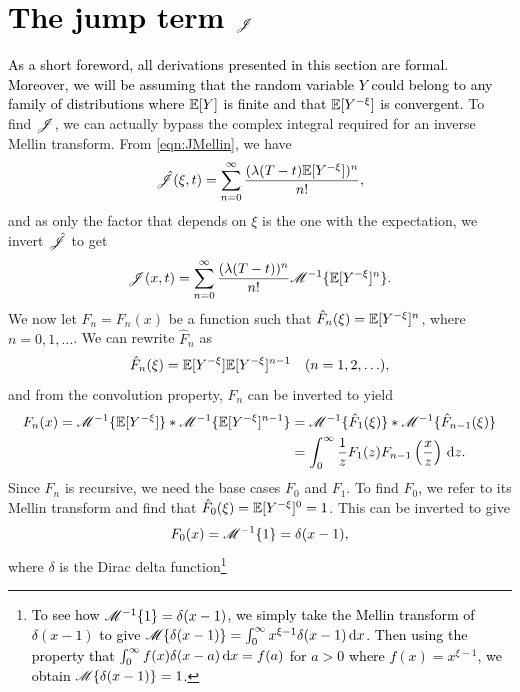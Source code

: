 \section{\textcolor{black}{The jump term $\mathscr J$}}
\textcolor{black}{As a short foreword, all derivations presented in this section are formal. Moreover, we will be assuming that the random variable $Y$ could belong to any family of distributions where $\mathbb E[Y]$ is finite and that $\mathbb E[Y^{-\xi}]$ is convergent.} To find $\mathscr J$, we can actually bypass the complex integral required for an inverse Mellin transform. From \eqref{eqn:JMellin}, we have
	\begin{align*}
		\hat {\mathscr J}(\xi,t) = \displaystyle\sum\limits_{n=0}^{\infty} \frac{(\lambda(T-t)\mathbb E[Y^{-\xi}])^n}{n!},
	\end{align*}
and as only the factor that depends on $\xi$ is the one with the expectation, we invert $\hat {\mathscr J}$ to get
	\begin{equation}
		\label{eqn:Jhat}
		\mathscr J(x,t) = \displaystyle\sum\limits_{n=0}^{\infty} \frac{(\lambda(T-t))^n}{n!}\mathscr M^{-1}\{ \mathbb E[Y^{-\xi}]^n \}.
	\end{equation}
We now let $F_n = F_n(x)$ be a function such that $\hat F_n(\xi) = \mathbb E[Y^{-\xi}]^n$, where $ n = 0, 1, \ldots$. We can rewrite $\hat F_n$ as
	\begin{equation*}
		\hat F_n(\xi) = \mathbb E[Y^{-\xi}] \mathbb E[Y^{-\xi}]^{n-1} \quad (n = 1,2,\ldots),
	\end{equation*}
and from the convolution property, $\hat F_n$ can be inverted to yield
	\begin{align*}
		F_n(x) = \mathscr M^{-1} \{ \mathbb E[Y^{-\xi}] \} \ast \mathscr M^{-1} \{ \mathbb E[Y^{-\xi}]^{n-1} \} &= \mathscr M^{-1}\{ \hat F_1(\xi) \} \ast \mathscr M^{-1}\{ \hat F_{n-1}(\xi) \} \\
		&= \int_0^\infty \frac{1}{z} F_1(z)F_{n-1}\left( \frac{x}{z} \right) \, \mathrm d z.
	\end{align*}
Since $F_n$ is recursive, we need the base cases $F_0$ and $F_1$. To find $F_0$, we refer to its Mellin transform and find that $\hat F_0(\xi) = \mathbb E[Y^{-\xi}]^0 = 1$. This can be inverted to give
	\begin{equation*}
		F_0(x) = \mathscr M^{-1}\{ 1 \} = \delta(x-1),
	\end{equation*}
where $\delta$ is the Dirac delta function\footnote{\textcolor{black}{To see how $\mathscr M^{-1}\{1\} = \delta(x-1)$, we simply take the Mellin transform of $\delta(x-1)$ to give $\mathscr M\{\delta(x-1)\} = \int_0^\infty x^{\xi-1}\delta(x-1) \, \mathrm d x$. Then using the property that $\int_0^\infty f(x)\delta(x-a) \, \mathrm d x = f(a)$ for $a > 0$ where $f(x) = x^{\xi-1}$, we obtain $\mathscr M\{\delta(x-1)\} = 1$.}}
